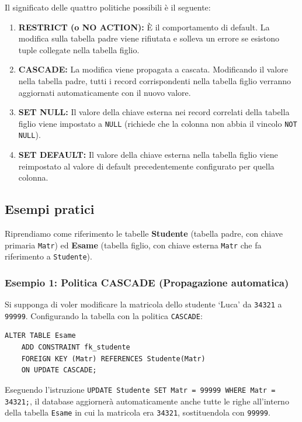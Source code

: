 Il significato delle quattro politiche possibili è il seguente:
\begin{enumerate}
    \item \textbf{RESTRICT (o NO ACTION):} È il comportamento di default. La modifica sulla tabella padre viene rifiutata e solleva un errore se esistono tuple collegate nella tabella figlio.
    \item \textbf{CASCADE:} La modifica viene propagata a cascata. Modificando il valore nella tabella padre, tutti i record corrispondenti nella tabella figlio verranno aggiornati automaticamente con il nuovo valore.
    \item \textbf{SET NULL:} Il valore della chiave esterna nei record correlati della tabella figlio viene impostato a \texttt{NULL} (richiede che la colonna non abbia il vincolo \texttt{NOT NULL}).
    \item \textbf{SET DEFAULT:} Il valore della chiave esterna nella tabella figlio viene reimpostato al valore di default precedentemente configurato per quella colonna.
\end{enumerate}

\subsection{Esempi pratici}

Riprendiamo come riferimento le tabelle \textbf{Studente} (tabella padre, con chiave primaria \texttt{Matr}) ed \textbf{Esame} (tabella figlio, con chiave esterna \texttt{Matr} che fa riferimento a \texttt{Studente}).

\subsubsection{Esempio 1: Politica CASCADE (Propagazione automatica)}
Si supponga di voler modificare la matricola dello studente `Luca' da \texttt{34321} a \texttt{99999}. Configurando la tabella con la politica \texttt{CASCADE}:
\begin{lstlisting}[language=sql_generic]
ALTER TABLE Esame 
    ADD CONSTRAINT fk_studente 
    FOREIGN KEY (Matr) REFERENCES Studente(Matr)
    ON UPDATE CASCADE;
\end{lstlisting}
Eseguendo l'istruzione \texttt{UPDATE Studente SET Matr = 99999 WHERE Matr = 34321;}, il database aggiornerà automaticamente anche tutte le righe all'interno della tabella \texttt{Esame} in cui la matricola era \texttt{34321}, sostituendola con \texttt{99999}.

